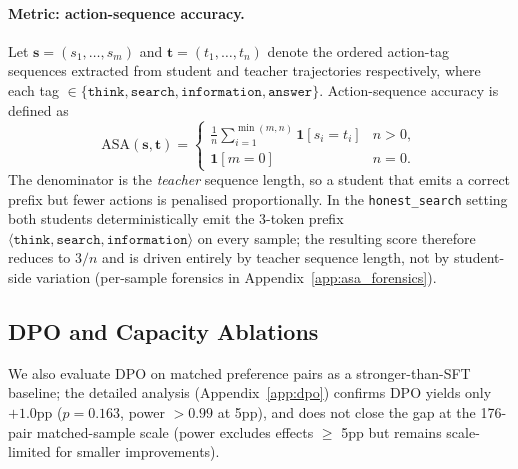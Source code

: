 \paragraph{Metric: action-sequence accuracy.}
Let $\mathbf{s}=(s_1,\dots,s_m)$ and $\mathbf{t}=(t_1,\dots,t_n)$ denote the ordered action-tag sequences extracted from student and teacher trajectories respectively, where each tag $\in\{\texttt{think},\texttt{search},\texttt{information},\texttt{answer}\}$. Action-sequence accuracy is defined as
\begin{equation}
\label{eq:asa}
\text{ASA}(\mathbf{s},\mathbf{t})=
\begin{cases}
\displaystyle\frac{1}{n}\sum_{i=1}^{\min(m,n)}\mathbf{1}[s_i=t_i] & n>0,\\
\mathbf{1}[m=0] & n=0.
\end{cases}
\end{equation}
The denominator is the \emph{teacher} sequence length, so a student that emits a correct prefix but fewer actions is penalised proportionally. In the \texttt{honest\_search} setting both students deterministically emit the 3-token prefix $\langle\texttt{think},\texttt{search},\texttt{information}\rangle$ on every sample; the resulting score therefore reduces to $3/n$ and is driven entirely by teacher sequence length, not by student-side variation (per-sample forensics in Appendix~\ref{app:asa_forensics}).

\subsection{DPO and Capacity Ablations}
\label{sec:dpo_results}

We also evaluate DPO on matched preference pairs as a stronger-than-SFT baseline; the detailed analysis (Appendix~\ref{app:dpo}) confirms DPO yields only $+1.0$pp ($p=0.163$, power $>0.99$ at 5pp), and does not close the gap at the 176-pair matched-sample scale (power excludes effects $\geq$ 5pp but remains scale-limited for smaller improvements).

